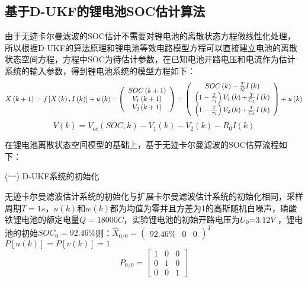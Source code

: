 \subsection{基于D-UKF的锂电池SOC估计算法}
由于无迹卡尔曼滤波的SOC估计不需要对锂电池的离散状态方程做线性化处理，所以根据D-UKF的算法原理和锂电池等效电路模型方程可以直接建立电池的离散状态空间方程，方程中SOC为待估计参数，在已知电池开路电压和电流作为估计系统的输入参数，得到锂电池系统的模型方程如下：
\begin{equation}
X\left( {k + 1} \right) = f\left[ {X\left( k \right),I\left( k \right)} \right] + u\left( k \right){\rm{ = }}\left( {\begin{array}{*{20}{c}}
{SOC\left( {k + 1} \right)}\\
{{V_1}\left( {k + 1} \right)}\\
{{V_2}\left( {k + 1} \right)}
\end{array}} \right) = \left( {\begin{array}{*{20}{c}}
{SOC\left( k \right) - \frac{T}{Q}I\left( k \right)}\\
{\left( {1 - \frac{T}{{{\tau _1}}}} \right){V_1}\left( k \right){\rm{ + }}\frac{T}{{{C_1}}}I\left( k \right)}\\
{\left( {1 - \frac{T}{{{\tau _2}}}} \right){V_2}\left( k \right){\rm{ + }}\frac{T}{{{C_2}}}I\left( k \right)}
\end{array}} \right) + u\left( k \right)
\end{equation}
\begin{equation}
V\left( k \right) = {V_{oc}}\left( {SOC,k} \right) - {V_1}\left( k \right) - {V_2}\left( k \right) - {R_0}I\left( k \right)
\end{equation}

在锂电池离散状态空间模型的基础上，基于无迹卡尔曼滤波的SOC估算流程如下：

(一)	D-UKF系统的初始化

	无迹卡尔曼滤波估计系统的初始化与扩展卡尔曼滤波估计系统的初始化相同，采样周期$T = 1s$，$u\left( k \right)$和$w\left( k \right)$都为均值为零并且方差为1的高斯随机白噪声，磷酸铁锂电池的额定电量$Q = 18000C$，实验锂电池的初始开路电压为${U_0}{\rm{ = }}3.12V$，锂电池的初始$SO{C_0} = 92.46\% $则：${\widehat X_{0/0}} = {\left( {\begin{array}{*{20}{c}}
{92.46\% }&0&0
\end{array}} \right)^T}$~$P\left[ {u\left( k \right)} \right] = P\left[ {v\left( k \right)} \right] = 1$
\[{P_{0/0}} = \left[ {\begin{array}{*{20}{c}}
1&0&0\\
0&1&0\\
0&0&1
\end{array}} \right]\]

